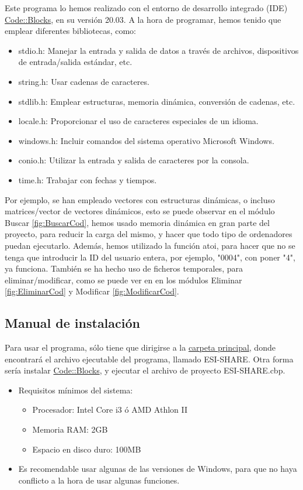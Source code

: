 Este programa lo hemos realizado con el entorno de desarrollo integrado (IDE) \href{https://www.codeblocks.org/}{Code::Blocks}, en su versión 20.03.
A la hora de programar, hemos tenido que emplear diferentes bibliotecas, como:
\begin{itemize}
  \item stdio.h: Manejar la entrada y salida de datos a través de archivos, dispositivos de entrada/salida estándar, etc.
  \item string.h: Usar cadenas de caracteres.
  \item stdlib.h: Emplear estructuras, memoria dinámica, conversión de cadenas, etc.
  \item locale.h: Proporcionar el uso de caracteres especiales de un idioma.
  \item windows.h: Incluir comandos del sistema operativo Microsoft Windows.
  \item conio.h: Utilizar la entrada y salida de caracteres por la consola.
  \item time.h: Trabajar con fechas y tiempos.
\end{itemize}

\bigskip

Por ejemplo, se han empleado vectores con estructuras dinámicas, o incluso matrices/vector de vectores dinámicos, esto se puede observar en el módulo Buscar \ref{fig:BuscarCod},
hemos usado memoria dinámica en gran parte del proyecto, para reducir la carga del mismo, y hacer que todo tipo de ordenadores puedan ejecutarlo. 
Además, hemos utilizado la función atoi, para hacer que no se tenga que introducir la ID del usuario entera, por ejemplo, "0004", con poner "4", ya funciona.
También se ha hecho uso de ficheros temporales, para eliminar/modificar, como se puede ver en en los módulos Eliminar \ref{fig:EliminarCod} y Modificar \ref{fig:ModificarCod}.

\subsection{Manual de instalación}

Para usar el programa, sólo tiene que dirigirse a la \href{run:./../..}{carpeta principal}, donde encontrará el archivo ejecutable del programa, llamado ESI-SHARE.
Otra forma sería instalar \href{https://www.codeblocks.org/}{Code::Blocks}, y ejecutar el archivo de proyecto ESI-SHARE.cbp.

\begin{itemize}
  \item Requisitos mínimos del sistema:
  \begin{itemize}
    \item Procesador: Intel Core i3 ó AMD Athlon II
    \item Memoria RAM: 2GB
    \item Espacio en disco duro: 100MB
  \end{itemize}
  \item Es recomendable usar algunas de las versiones de Windows, para que no haya conflicto a la hora de usar algunas funciones.
\end{itemize}

